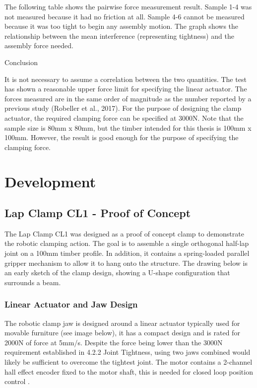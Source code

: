 The following table shows the pairwise force measurement result. Sample 1-4 was not measured because it had no friction at all. Sample 4-6 cannot be measured because it was too tight to begin any assembly motion. The graph shows the relationship between the mean interference (representing tightness) and the assembly force needed. 

Conclusion

It is not necessary to assume a correlation between the two quantities. The test has shown a reasonable upper force limit for specifying the linear actuator. The forces measured are in the same order of magnitude as the number reported by a previous study (Robeller et al., 2017). For the purpose of designing the clamp actuator, the required clamping force can be specified at 3000N. 
Note that the sample size is 80mm x 80mm, but the timber intended for this thesis is 100mm x 100mm. However, the result is good enough for the purpose of specifying the clamping force.

\section{Development}
\label{section:exploration-1-development}

\subsection{Lap Clamp CL1 - Proof of Concept}
\label{subsection:exploration-1-lap-clamp-cl1-proof-of-concept}

The Lap Clamp CL1 was designed as a proof of concept clamp to demonstrate the robotic clamping action. The goal is to assemble a single orthogonal half-lap joint on a 100mm timber profile. 
In addition, it contains a spring-loaded parallel gripper mechanism to allow it to hang onto the structure. The drawing below is an early sketch of the clamp design, showing a U-shape configuration that surrounds a beam.

\subsubsection{Linear Actuator and Jaw Design}
\label{subsubsection:exploration-1-linear-actuator-and-jaw-design}

The robotic clamp jaw is designed around a linear actuator typically used for movable furniture (see image below), it has a compact design and is rated for 2000N of force at 5mm/s. Despite the force being lower than the 3000N requirement established in 4.2.2 Joint Tightness, using two jaws combined would likely be sufficient to overcome the tightest joint. The motor contains a 2-channel hall effect encoder fixed to the motor shaft, this is needed for closed loop position control . 


